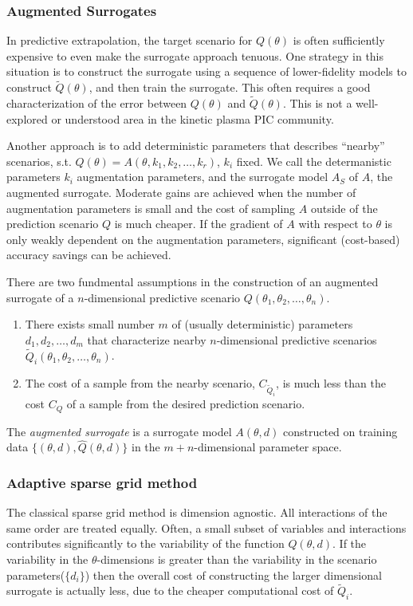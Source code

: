 \subsubsection*{Augmented Surrogates}

In predictive extrapolation, the target scenario for $Q(\theta)$ is often sufficiently expensive to even make the surrogate 
approach tenuous.   One strategy in this
situation is to construct the surrogate using a sequence of lower-fidelity models to construct $\tilde{Q}(\theta)$, and then train the surrogate\cite{Pehermulti}.  This often requires
a good characterization of the error between $Q(\theta)$ and $\tilde{Q}(\theta)$.  This is not a well-explored or understood area in the kinetic plasma PIC community.  

Another approach is to add deterministic parameters that describes ``nearby'' scenarios,
s.t. $Q(\theta)=A(\theta,k_1,k_2,\ldots,k_r)$, $k_i$ fixed.  We call the determanistic parameters $k_i$ augmentation parameters, and the surrogate model
$A_S$ of $A$, the augmented surrogate.  Moderate gains are achieved when the number of augmentation parameters is small and the cost of sampling $A$ outside of the prediction
scenario $Q$ is much cheaper.  If the gradient of $A$ with respect to $\theta$ is only weakly dependent on the augmentation parameters, 
significant (cost-based) accuracy savings can be achieved.  

There are two fundmental assumptions in the construction of an augmented surrogate of
a $n$-dimensional predictive scenario $Q(\theta_1,\theta_2,\ldots,\theta_n)$.
\begin{enumerate}
\item There exists small number $m$ of (usually deterministic) parameters $d_1,d_2,\ldots,d_m$ that characterize
nearby $n$-dimensional predictive scenarios $\tilde{Q}_i(\theta_1,\theta_2,\ldots,\theta_n)$.
\item The cost of a sample from the nearby scenario, $C_{\tilde{Q}_i}$, is much less than the cost $C_Q$ of 
a sample from the desired prediction scenario.
\end{enumerate} 

The {\em augmented surrogate} is a surrogate model $A(\theta,d)$ constructed on training data $\{(\theta,d),\hat{Q}(\theta,d)\}$ in the $m+n$-dimensional
parameter space.   %

\subsubsection*{Adaptive sparse grid method}  
The classical sparse grid method is dimension agnostic\cite{bungartz2004}. All interactions
of the same order are treated equally. Often, a small subset of variables
and interactions contributes significantly to the variability of the function $Q(\theta,d)$.  If the variability in the $\theta$-dimensions is
greater than the variability in the scenario parameters($\{d_i\}$) then the overall cost of constructing the 
larger dimensional surrogate is actually less, due to the cheaper computational cost of $\tilde{Q}_i$.

